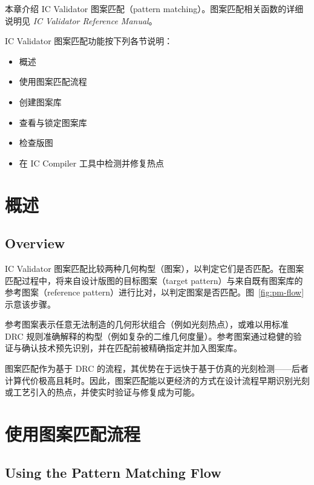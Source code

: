 \label{chap:pmatch}

本章介绍 IC Validator 图案匹配（pattern matching）。图案匹配相关函数的详细说明见 \textit{IC Validator Reference Manual}。

IC Validator 图案匹配功能按下列各节说明：
\begin{itemize}
  \item 概述
  \item 使用图案匹配流程
  \item 创建图案库
  \item 查看与锁定图案库
  \item 检查版图
  \item 在 IC Compiler 工具中检测并修复热点
\end{itemize}

\section{概述}
\subsection*{Overview}

IC Validator 图案匹配比较两种几何构型（图案），以判定它们是否匹配。在图案匹配过程中，将来自设计版图的目标图案（target pattern）与来自既有图案库的参考图案（reference pattern）进行比对，以判定图案是否匹配。图~\ref{fig:pm-flow} 示意该步骤。

参考图案表示任意无法制造的几何形状组合（例如光刻热点），或难以用标准 DRC 规则准确解释的构型（例如复杂的二维几何度量）。参考图案通过稳健的验证与确认技术预先识别，并在匹配前被精确指定并加入图案库。

图案匹配作为基于 DRC 的流程，其优势在于远快于基于仿真的光刻检测——后者计算代价极高且耗时。因此，图案匹配能以更经济的方式在设计流程早期识别光刻或工艺引入的热点，并使实时验证与修复成为可能。


\section{使用图案匹配流程}
\subsection*{Using the Pattern Matching Flow}

